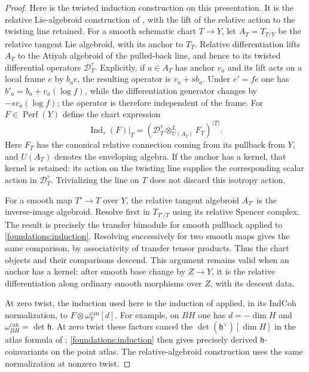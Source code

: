 \begin{proof}
Here is the twisted induction construction on this presentation.
It is the relative Lie-algebroid construction of
\cite[Section~6.3, especially Lemmas~6.3.15--6.3.16]{DrinfeldGaitsgoryFiniteness},
with the lift of the relative action to the twisting line retained.
For a smooth schematic chart $T\to Y$, let $A_T=T_{T/Y}$ be the relative
tangent Lie algebroid, with its anchor to $T_T$.  Relative differentiation
lifts $A_T$ to the Atiyah algebroid of the pulled-back line, and hence to
its twisted differential operators $\mathcal D_T^\tau$.  Explicitly, if
$a\in A_T$ has anchor $v_a$ and its lift acts on a local frame $e$ by
$b_ae$, the resulting operator is $v_a+s b_a$.  Under $e'=fe$ one has
$b'_a=b_a+v_a(\log f)$, while the differentiation generator changes by
$-s v_a(\log f)$; the operator is therefore independent of the frame.
For
$F\in\operatorname{Perf}(Y)$ define the chart expression
\begin{equation}\label{foundations:induction}
 \operatorname{Ind}_\tau(F)|_T
 =\left(\mathcal D_T^\tau
       \mathop{\otimes}^{L}_{U(A_T)}F_T\right)^{\langle T\rangle}.
\end{equation}
Here $F_T$ has the canonical relative connection coming from its
pullback from $Y$, and $U(A_T)$ denotes the enveloping algebra.  If the
anchor has a kernel, that kernel is retained: its action on the twisting
line supplies the corresponding scalar action in
$\mathcal D_T^\tau$.  Trivializing the line on $T$ does not discard this
isotropy action.

For a smooth map $T'\to T$ over $Y$, the relative tangent algebroid
$A_{T'}$ is the inverse-image algebroid.  Resolve first in
$T_{T'/T}$ using its relative Spencer complex.  The result is precisely
the transfer bimodule for smooth pullback applied to
\eqref{foundations:induction}.  Resolving successively for two smooth
maps gives the same comparison, by associativity of transfer tensor
products.  Thus the chart objects and their comparisons descend.
This argument remains valid when an anchor has a kernel: after smooth
base change by $Z\to Y$, it is the relative differentiation along
ordinary smooth morphisms over $Z$, with its descent data.

At zero twist, the induction used here is the induction of
\cite[Section~6.3.21]{DrinfeldGaitsgoryFiniteness}
applied, in its IndCoh normalization, to
$F\otimes\omega_Y^{\mathrm{can}}[d]$.
For example, on $BH$ one has $d=-\dim H$ and
$\omega_{BH}^{\mathrm{can}}=\det\mathfrak h$.
At zero twist these factors cancel the
$\det(\mathfrak h^\vee)[\dim H]$ in the atlas formula of
\cite[Section~6.4.8]{DrinfeldGaitsgoryFiniteness};
\eqref{foundations:induction} then gives precisely derived
$\mathfrak h$-coinvariants on the point atlas.  The relative-algebroid
construction uses the same normalization at nonzero twist.


\end{proof}
